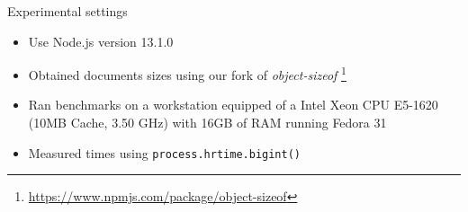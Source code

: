 \documentclass[10pt]{beamer}
\begin{document}
\begin{frame}{Experimental settings}
  \begin{itemize}
    \item Use Node.js version 13.1.0
    \item Obtained documents sizes using our fork of \emph{object-sizeof} \footnote{\url{https://www.npmjs.com/package/object-sizeof}}
    \item Ran benchmarks on a workstation equipped of a Intel Xeon CPU E5-1620 (10MB Cache, 3.50 GHz) with 16GB of RAM running Fedora 31
    \item Measured times using \texttt{process.hrtime.bigint()}
  \end{itemize}
\end{frame}
\end{document}
